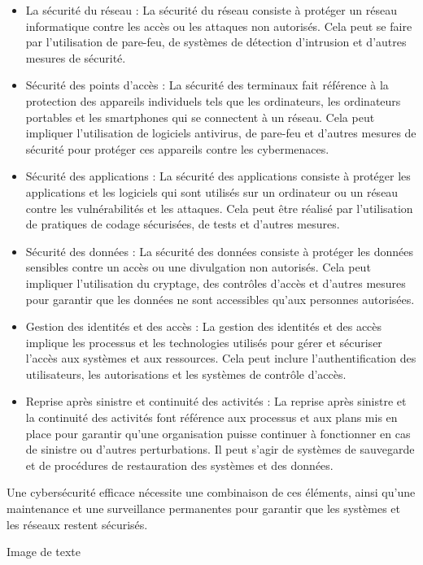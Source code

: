 \begin{itemize}
\item La sécurité du réseau : La sécurité du réseau consiste à protéger un réseau informatique contre les accès ou les attaques non autorisés. Cela peut se faire par l'utilisation de pare-feu, de systèmes de détection d'intrusion et d'autres mesures de sécurité.
\item Sécurité des points d'accès : La sécurité des terminaux fait référence à la protection des appareils individuels tels que les ordinateurs, les ordinateurs portables et les smartphones qui se connectent à un réseau. Cela peut impliquer l'utilisation de logiciels antivirus, de pare-feu et d'autres mesures de sécurité pour protéger ces appareils contre les cybermenaces.
\item Sécurité des applications : La sécurité des applications consiste à protéger les applications et les logiciels qui sont utilisés sur un ordinateur ou un réseau contre les vulnérabilités et les attaques. Cela peut être réalisé par l'utilisation de pratiques de codage sécurisées, de tests et d'autres mesures.
\item Sécurité des données : La sécurité des données consiste à protéger les données sensibles contre un accès ou une divulgation non autorisés. Cela peut impliquer l'utilisation du cryptage, des contrôles d'accès et d'autres mesures pour garantir que les données ne sont accessibles qu'aux personnes autorisées.
\item Gestion des identités et des accès : La gestion des identités et des accès implique les processus et les technologies utilisés pour gérer et sécuriser l'accès aux systèmes et aux ressources. Cela peut inclure l'authentification des utilisateurs, les autorisations et les systèmes de contrôle d'accès.
\item Reprise après sinistre et continuité des activités : La reprise après sinistre et la continuité des activités font référence aux processus et aux plans mis en place pour garantir qu'une organisation puisse continuer à fonctionner en cas de sinistre ou d'autres perturbations. Il peut s'agir de systèmes de sauvegarde et de procédures de restauration des systèmes et des données.
\end{itemize}

Une cybersécurité efficace nécessite une combinaison de ces éléments, ainsi qu'une maintenance et une surveillance permanentes pour garantir que les systèmes et les réseaux restent sécurisés.


{Image de texte}



